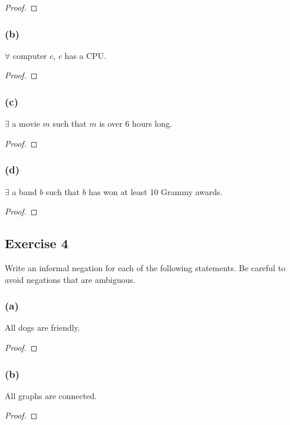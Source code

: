 \documentclass[14pt]{extarticle}
\newcommand{\fa}{\forall}
\newcommand{\te}{\exists}
\begin{document}
\begin{proof}

\end{proof}

\subsubsection{(b)}
$\fa$ computer $c$, $c$ has a CPU.

\begin{proof}

\end{proof}

\subsubsection{(c)}
$\te$ a movie $m$ such that $m$ is over 6 hours long.

\begin{proof}

\end{proof}

\subsubsection{(d)}
$\te$ a band $b$ such that $b$ has won at least 10 Grammy awards.

\begin{proof}

\end{proof}

\subsection{Exercise 4}
Write an informal negation for each of the following statements. Be careful to avoid negations that are ambiguous.

\subsubsection{(a)}
All dogs are friendly.

\begin{proof}

\end{proof}

\subsubsection{(b)}
All graphs are connected.

\begin{proof}

\end{proof}
\end{document}

